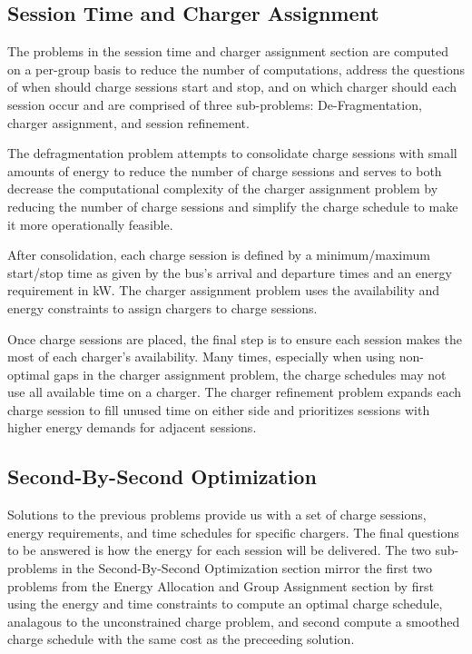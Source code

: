 \subsection{Session Time and Charger Assignment}
The problems in the session time and charger assignment section are computed on a per-group basis to reduce the number of computations, address the questions of when should charge sessions start and stop, and on which charger should each session occur and are comprised of three sub-problems: De-Fragmentation, charger assignment, and session refinement.
\par The defragmentation problem attempts to consolidate charge sessions with small amounts of energy to reduce the number of charge sessions and serves to both decrease the computational complexity of the charger assignment problem by reducing the number of charge sessions and simplify the charge schedule to make it more operationally feasible.
\par After consolidation, each charge session is defined by a minimum/maximum start/stop time as given by the bus's arrival and departure times and an energy requirement in kW. The charger assignment problem uses the availability and energy constraints to assign chargers to charge sessions.
\par Once charge sessions are placed, the final step is to ensure each session makes the most of each charger's availability. Many times, especially when using non-optimal gaps in the charger assignment problem, the charge schedules may not use all available time on a charger. The charger refinement problem expands each charge session to fill unused time on either side and prioritizes sessions with higher energy demands for adjacent sessions.
\subsection{Second-By-Second Optimization}
Solutions to the previous problems provide us with a set of charge sessions, energy requirements, and time schedules for specific chargers. The final questions to be answered is how the energy for each session will be delivered. The two sub-problems in the Second-By-Second Optimization section mirror the first two problems from the Energy Allocation and Group Assignment section by first using the energy and time constraints to compute an optimal charge schedule, analagous to the unconstrained charge problem, and second compute a smoothed charge schedule with the same cost as the preceeding solution.




